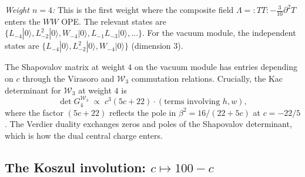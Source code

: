 \documentclass[11pt]{article}
\newcommand{\cW}{\mathcal{W}}
\begin{document}
\medskip
\emph{Weight $n = 4$:}  This is the first weight where the
composite field $\Lambda = {:}TT{:} - \tfrac{3}{10}\partial^2 T$
enters the $WW$ OPE.  The relevant states are
$\{L_{-4}|0\rangle, L_{-2}^2|0\rangle, W_{-4}|0\rangle,
L_{-1}L_{-3}|0\rangle, \ldots\}$.  For the vacuum module,
the independent states are $\{L_{-4}|0\rangle,
L_{-2}^2|0\rangle, W_{-4}|0\rangle\}$ (dimension $3$).

The Shapovalov matrix at weight $4$ on the vacuum module has
entries depending on $c$ through the Virasoro and $\cW_3$
commutation relations.  Crucially, the Kac determinant
for $\cW_3$ at weight $4$ is
\begin{equation}\label{eq:W3-Kac-det-4}
\det G_4^{\cW_3}
\;\propto\;
c^3(5c + 22) \cdot (\text{terms involving } h, w),
\end{equation}
where the factor $(5c + 22)$ reflects the pole in $\beta^2 = 16/(22+5c)$
at $c = -22/5$.  The Verdier duality exchanges zeros and poles of
the Shapovalov determinant, which is how the dual central charge
enters.

\subsection{The Koszul involution: $c \mapsto 100 - c$}
\end{document}
